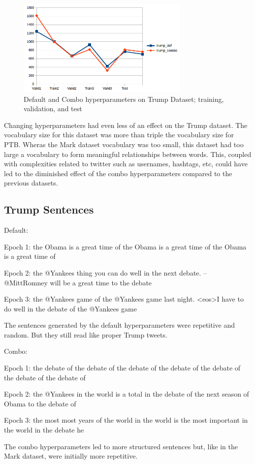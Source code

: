 \documentclass[10pt,a4paper]{article}
\begin{document}
\begin{figure}[H]
  \begin{center}
    \includegraphics[width=0.75\textwidth] {trump2.png}
    \caption{Default and Combo hyperparameters on Trump Dataset; training, validation, and test}
  \end{center}
\end{figure}

Changing hyperparameters had even less of an effect on the Trump dataset. The vocabulary size for this dataset was more than triple the vocabulary size for PTB. Wheras the Mark dataset vocabulary was too small, this dataset had too large a vocabulary to form meaningful relationships between words. This, coupled with complexities related to twitter such as usernames, hashtags, etc, could have led to the  diminished effect of the combo hyperparameters compared to the previous datasets.

\subsection{Trump Sentences}
Default:


Epoch 1: the Obama is a great time of the Obama is a great time of the Obama is a great time of

Epoch 2: the @Yankees thing you can do well in the next debate. -- @MittRomney will be a great time to the debate

Epoch 3: the @Yankees game of the @Yankees game last night. <eos>I have to do well in the debate of the @Yankees game

The sentences generated by the default hyperparameters were repetitive and random. But they still read like proper Trump tweets.



Combo:


Epoch 1: the debate of the debate of the debate of the debate of the debate of the debate of the debate of

Epoch 2: the @Yankees in the world is a total in the debate of the next season of Obama to the debate of

Epoch 3: the most most years of the world in the world is the most important in the world in the debate he

The combo hyperparameters led to more structured sentences but, like in the Mark dataset, were initially more repetitive. 
\end{document}
